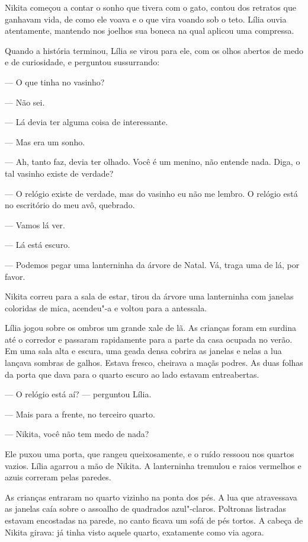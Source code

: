 Nikita começou a contar o sonho que tivera com o gato, contou dos retratos
que ganhavam vida, de como ele voava e o que vira voando sob o teto.
Lília ouvia atentamente, mantendo nos joelhos sua boneca na qual aplicou uma compressa.

Quando a história terminou, Lília se virou para ele, com os olhos
abertos de medo e de curiosidade, e perguntou sussurrando:

--- O que tinha no vasinho?

--- Não sei.

--- Lá devia ter alguma coisa de interessante.

--- Mas era um sonho.

--- Ah, tanto faz, devia ter olhado. Você é um menino, não entende nada.
Diga, o tal vasinho existe de verdade?

--- O relógio existe de verdade, mas do vasinho eu não me lembro. O
relógio está no escritório do meu avô, quebrado.

--- Vamos lá ver.

--- Lá está escuro.

--- Podemos pegar uma lanterninha da árvore de Natal. Vá, traga uma de
lá, por favor.

Nikita correu para a sala de estar, tirou da árvore uma lanterninha com
janelas coloridas de mica, acendeu"-a e voltou para a antessala.

Lília jogou sobre os ombros um grande xale de lã. As crianças foram em
surdina até o corredor e passaram rapidamente para a parte da casa
ocupada no verão. Em uma sala alta e escura, uma geada densa cobrira as
janelas e nelas a lua lançava sombras de galhos. Estava fresco,
cheirava a maçãs podres. As duas folhas da porta que dava para o quarto
escuro ao lado estavam entreabertas.

--- O relógio está aí? --- perguntou Lília.

--- Mais para a frente, no terceiro quarto.

--- Nikita, você não tem medo de nada?

Ele puxou uma porta, que rangeu queixosamente, e o ruído ressoou nos
quartos vazios. Lília agarrou a mão de Nikita. A lanterninha tremulou e
raios vermelhos e azuis correram pelas paredes.

As crianças entraram no quarto vizinho na ponta dos pés. A lua que
atravessava as janelas caía sobre o assoalho de quadrados azul"-claros.
Poltronas listradas estavam encostadas na parede, no canto ficava um sofá de
pés tortos. A cabeça de Nikita girava: já tinha visto aquele quarto,
exatamente como via agora.

